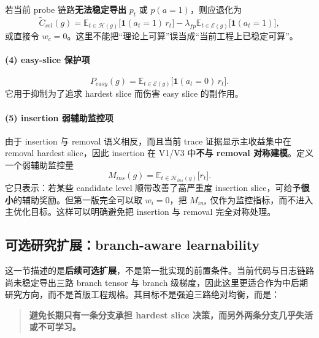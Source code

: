 \documentclass[11pt,a4paper]{ctexart}
\newcommand{\E}{\mathbb{E}}
\newcommand{\I}{\mathbf{1}}
\begin{document}
若当前 probe 链路\textbf{无法稳定导出} \(p_t\) 或 \(p(a=1)\)，则应退化为
\begin{equation}
\tilde C_{sel}(g)=\E_{t\in \mathcal{H}(g)}\big[\I(a_t=1)\,r_t\big]-\lambda_{fp}\E_{t\in \mathcal{E}(g)}\big[\I(a_t=1)\big],
\label{eq:csel_fallback}
\end{equation}
或直接令 \(w_c=0\)。这里不能把“理论上可算”误当成“当前工程上已稳定可算”。

\paragraph{(4) easy-slice 保护项}
\begin{equation}
P_{easy}(g)=\E_{t\in \mathcal{E}(g)}\big[\I(a_t=0)\,r_t\big].
\label{eq:peasy}
\end{equation}
它用于抑制为了追求 hardest slice 而伤害 easy slice 的副作用。

\paragraph{(5) insertion 弱辅助监控项}
由于 insertion 与 removal 语义相反，而且当前 trace 证据显示主收益集中在 removal hardest slice，因此 insertion 在 V1/V3 中\textbf{不与 removal 对称建模}。定义一个弱辅助监控量
\begin{equation}
M_{ins}(g)=\E_{t\in \mathcal{H}_{ins}(g)}\big[r_t\big].
\label{eq:mins}
\end{equation}
它只表示：若某些 candidate level 顺带改善了高严重度 insertion slice，可给予\textbf{很小}的辅助奖励。但第一版完全可以取 \(w_i=0\)，把 \(M_{ins}\) 仅作为监控指标，而不进入主优化目标。这样可以明确避免把 insertion 与 removal 完全对称处理。

\subsection{可选研究扩展：branch-aware learnability}
这一节描述的是\textbf{后续可选扩展}，不是第一批实现的前置条件。当前代码与日志链路尚未稳定导出三路 branch tensor 与 branch 级梯度，因此这里更适合作为中后期研究方向，而不是首版工程规格。其目标不是强迫三路绝对均衡，而是：
\begin{quote}
\textbf{避免长期只有一条分支承担 hardest slice 决策，而另外两条分支几乎失活或不可学习。}
\end{quote}
\end{document}
